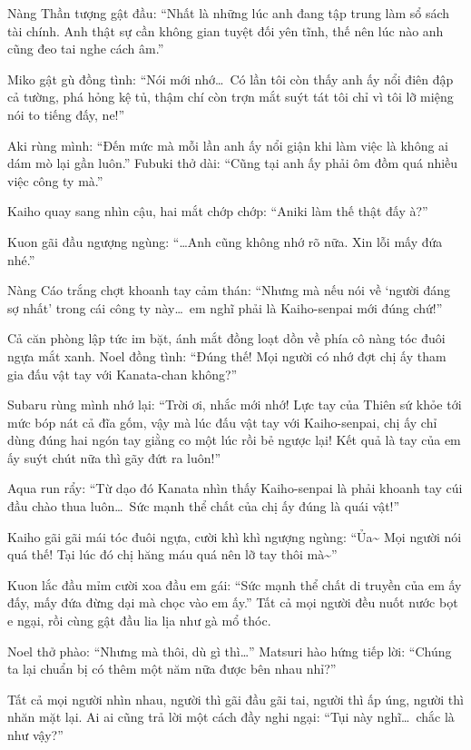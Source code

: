 \documentclass[../main.tex]{subfiles}
\begin{document}
Nàng Thần tượng gật đầu: ``Nhất là những lúc anh đang tập trung làm sổ sách tài chính. Anh thật sự cần không gian tuyệt đối yên tĩnh, thế nên lúc nào anh cũng đeo tai nghe cách âm.''

Miko gật gù đồng tình: ``Nói mới nhớ\dots\ Có lần tôi còn thấy anh ấy nổi điên đập cả tường, phá hỏng kệ tủ, thậm chí còn trợn mắt suýt tát tôi chỉ vì tôi lỡ miệng nói to tiếng đấy, ne!''

Aki rùng mình: ``Đến mức mà mỗi lần anh ấy nổi giận khi làm việc là không ai dám mò lại gần luôn.'' Fubuki thở dài: ``Cũng tại anh ấy phải ôm đồm quá nhiều việc công ty mà.''

Kaiho quay sang nhìn cậu, hai mắt chớp chớp: ``Aniki làm thế thật đấy à?''

Kuon gãi đầu ngượng ngùng: ``\dots Anh cũng không nhớ rõ nữa. Xin lỗi mấy đứa nhé.''

Nàng Cáo trắng chợt khoanh tay cảm thán: ``Nhưng mà nếu nói về `người đáng sợ nhất' trong cái công ty này\dots\ em nghĩ phải là Kaiho-senpai mới đúng chứ!''

Cả căn phòng lập tức im bặt, ánh mắt đồng loạt dồn về phía cô nàng tóc đuôi ngựa mắt xanh. Noel đồng tình: ``Đúng thế! Mọi người có nhớ đợt chị ấy tham gia đấu vật tay với Kanata-chan không?''

Subaru rùng mình nhớ lại: ``Trời ơi, nhắc mới nhớ! Lực tay của Thiên sứ khỏe tới mức bóp nát cả đĩa gốm, vậy mà lúc đấu vật tay với Kaiho-senpai, chị ấy chỉ dùng đúng hai ngón tay giằng co một lúc rồi bẻ ngược lại! Kết quả là tay của em ấy suýt chút nữa thì gãy đứt ra luôn!''

Aqua run rẩy: ``Từ dạo đó Kanata nhìn thấy Kaiho-senpai là phải khoanh tay cúi đầu chào thua luôn\dots\ Sức mạnh thể chất của chị ấy đúng là quái vật!''

Kaiho gãi gãi mái tóc đuôi ngựa, cười khì khì ngượng ngùng: ``Ủa\~{} Mọi người nói quá thế! Tại lúc đó chị hăng máu quá nên lỡ tay thôi mà\~{}''

Kuon lắc đầu mỉm cười xoa đầu em gái: ``Sức mạnh thể chất di truyền của em ấy đấy, mấy đứa đừng dại mà chọc vào em ấy.'' Tất cả mọi người đều nuốt nước bọt e ngại, rồi cùng gật đầu lia lịa như gà mổ thóc.

Noel thở phào: ``Nhưng mà thôi, dù gì thì\dots'' Matsuri hào hứng tiếp lời: ``Chúng ta lại chuẩn bị có thêm một năm nữa được bên nhau nhỉ?''

Tất cả mọi người nhìn nhau, người thì gãi đầu gãi tai, người thì ấp úng, người thì nhăn mặt lại. Ai ai cũng trả lời một cách đầy nghi ngại: ``Tụi này nghĩ\dots\ chắc là như vậy?''
\end{document}
